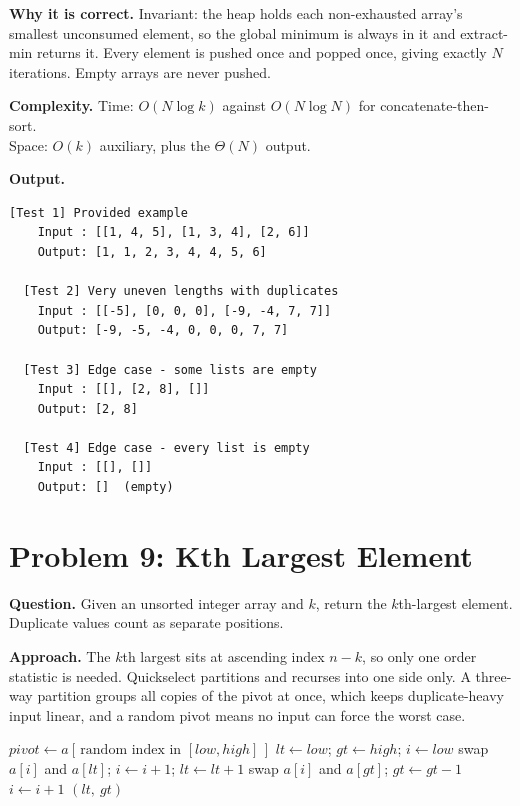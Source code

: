 \documentclass[11pt]{article}
\begin{document}
\textbf{Why it is correct.} Invariant: the heap holds each non-exhausted array's smallest unconsumed element, so the global minimum is always in it and extract-min returns it. Every element is pushed once and popped once, giving exactly $N$ iterations. Empty arrays are never pushed.

\textbf{Complexity.} Time: $O(N\log k)$ against $O(N\log N)$ for concatenate-then-sort.\\
Space: $O(k)$ auxiliary, plus the $\Theta(N)$ output.

\textbf{Output.}

\begin{lstlisting}[style=term]
  [Test 1] Provided example
    Input : [[1, 4, 5], [1, 3, 4], [2, 6]]
    Output: [1, 1, 2, 3, 4, 4, 5, 6]

  [Test 2] Very uneven lengths with duplicates
    Input : [[-5], [0, 0, 0], [-9, -4, 7, 7]]
    Output: [-9, -5, -4, 0, 0, 0, 7, 7]

  [Test 3] Edge case - some lists are empty
    Input : [[], [2, 8], []]
    Output: [2, 8]

  [Test 4] Edge case - every list is empty
    Input : [[], []]
    Output: []  (empty)
\end{lstlisting}

\newpage

\section*{Problem 9: Kth Largest Element}
\textbf{Question.} Given an unsorted integer array and $k$, return the $k$th-largest element. Duplicate values count as separate positions.

\textbf{Approach.} The $k$th largest sits at ascending index $n-k$, so only one order statistic is needed. Quickselect partitions and recurses into one side only. A three-way partition groups all copies of the pivot at once, which keeps duplicate-heavy input linear, and a random pivot means no input can force the worst case.

\begin{algorithm}[H]
\caption{Three-Way Partition (Dutch National Flag)}
\begin{algorithmic}[1]
    \State $pivot \gets a[\,\text{random index in } [low, high]\,]$
    \State $lt \gets low$; \quad $gt \gets high$; \quad $i \gets low$
            \State swap $a[i]$ and $a[lt]$; \quad $i \gets i+1$; \quad $lt \gets lt+1$
            \State swap $a[i]$ and $a[gt]$; \quad $gt \gets gt-1$
        \Else
            \State $i \gets i+1$
        \EndIf
    \EndWhile
    \State \Return $(lt,\ gt)$ 
\EndFunction
\end{algorithmic}
\end{algorithm}
\end{document}

